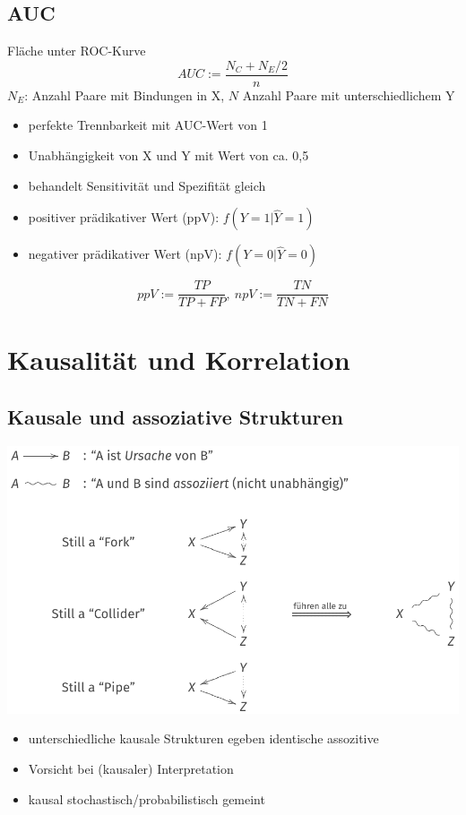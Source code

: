 \documentclass[10pt,a4paper,landscape]{article}
\begin{document}
\begin{multicols}{4}
\subsection{AUC}
Fläche unter ROC-Kurve
\[
AUC := \frac{N_C+N_E/2}{n}
\]
$N_E$: Anzahl Paare mit Bindungen in X, $N$ Anzahl Paare mit unterschiedlichem Y

\begin{itemize}
\item perfekte Trennbarkeit mit AUC-Wert von 1
\item Unabhängigkeit von X und Y mit Wert von ca. 0,5
\item behandelt Sensitivität und Spezifität gleich
\item positiver prädikativer Wert (ppV): $f(Y=1|\hat{Y}=1)$
\item negativer prädikativer Wert (npV): $f(Y=0|\hat{Y}=0)$
\end{itemize}

\[
ppV := \frac{TP}{TP + FP}, ~npV:= \frac{TN}{TN + FN}
\]


\section{Kausalität und Korrelation}

\subsection{Kausale und assoziative Strukturen}
\includegraphics[scale=0.2]{Bilder/kasualassostruk.png} 
\begin{itemize}
\item unterschiedliche kausale Strukturen egeben identische assozitive
\item Vorsicht bei (kausaler) Interpretation
\item kausal stochastisch/probabilistisch gemeint
\end{itemize}


\end{multicols}
\end{document}
